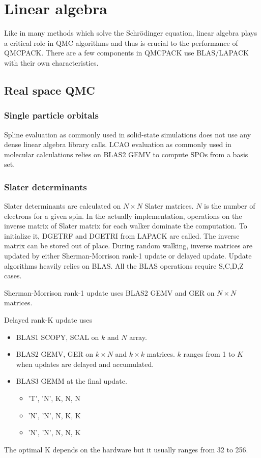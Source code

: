 \section{Linear algebra}

Like in many methods which solve the Schr\"odinger equation, linear algebra plays a critical role in QMC algorithms and thus is crucial to the performance of QMCPACK.
There are a few components in QMCPACK use BLAS/LAPACK with their own characteristics.

\subsection{Real space QMC}
\subsubsection{Single particle orbitals}
Spline evaluation as commonly used in solid-state simulations does not use any dense linear algebra library calls.
LCAO evaluation as commonly used in molecular calculations relies on BLAS2 GEMV to compute SPOs from a basis set.

\subsubsection{Slater determinants}
Slater determinants are calculated on $N \times N$ Slater matrices. $N$ is the number of electrons for a given spin.
In the actually implementation, operations on the inverse matrix of Slater matrix for each walker dominate the computation.
To initialize it, DGETRF and DGETRI from LAPACK are called. The inverse matrix can be stored out of place.
During random walking, inverse matrices are updated by either Sherman-Morrison rank-1 update or delayed update.
Update algorithms heavily relies on BLAS. All the BLAS operations require S,C,D,Z cases.

Sherman-Morrison rank-1 update uses BLAS2 GEMV and GER on $N \times N$ matrices.

Delayed rank-K update uses
\begin{itemize}
  \item BLAS1 SCOPY, SCAL on $k$ and $N$ array.
  \item BLAS2 GEMV, GER on $k \times N$ and $k \times k$ matrices. $k$ ranges from 1 to $K$ when updates are delayed and accumulated.
  \item BLAS3 GEMM at the final update.
    \begin{itemize}
       \item 'T', 'N', K, N, N
       \item 'N', 'N', N, K, K
       \item 'N', 'N', N, N, K
    \end{itemize}
\end{itemize}
The optimal K depends on the hardware but it usually ranges from 32 to 256.

